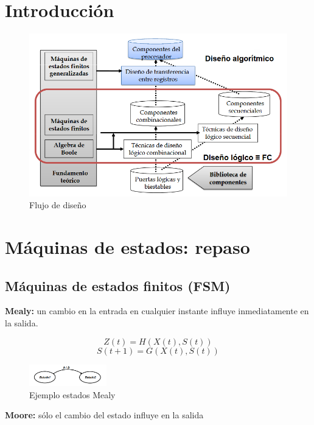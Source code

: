 \section{Introducción}
\begin{figure}[H]
	\centering
	\includegraphics[width=\textwidth]{images/Tema_4/Flujo_Diseno.PNG}
	\caption{Flujo de diseño}
\end{figure}
\section{Máquinas de estados: repaso}
\subsection{Máquinas de estados finitos (FSM)}
\textbf{Mealy:} un cambio en la entrada en cualquier instante influye inmediatamente  en la salida.

\begin{multicols}{2}
	\[
		Z\left(t\right) = H\left(X\left(t\right), S\left(t\right)\right)
	\]
	\[
		S\left(t+1\right)= G\left(X\left(t\right), S\left(t\right)\right)
	\]
	\vfill
	\null
	\begin{figure}[H]
		\centering
		\includegraphics[width=0.3\textwidth]{images/Tema_4/Mealy.PNG}
		\caption{Ejemplo estados Mealy}
	\end{figure}
\end{multicols}

\textbf{Moore:} sólo el cambio del estado influye en la salida

